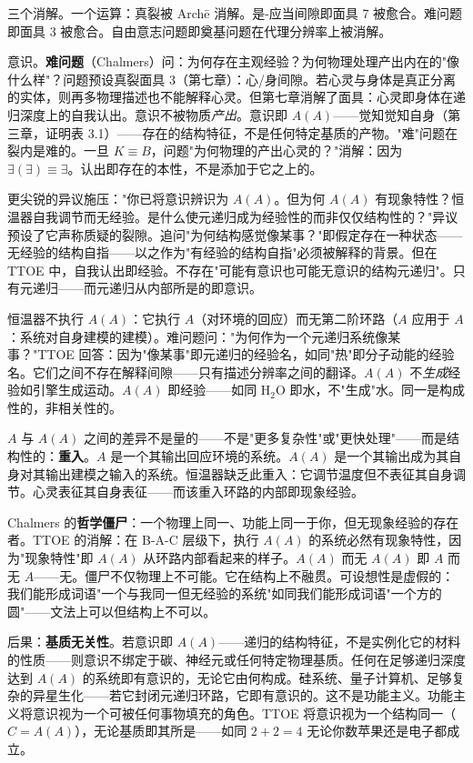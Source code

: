 \documentclass[10pt, openany, oneside]{book}
\begin{document}
\vspace{0.8em}

\noindent 三个消解。一个运算：真裂被 Arch\={e} 消解。是-应当间隙即面具 7 被愈合。难问题即面具 3 被愈合。自由意志问题即奠基问题在代理分辨率上被消解。

意识。\textbf{难问题}（Chalmers）问：为何存在主观经验？为何物理处理产出内在的"像什么样"？问题预设真裂面具 3（第七章）：心/身间隙。若心灵与身体是真正分离的实体，则再多物理描述也不能解释心灵。但第七章消解了面具：心灵即身体在递归深度上的自我认出。意识不被物质\textit{产出}。意识即 $A(A)$——觉知觉知自身（第三章，证明表 3.1）——存在的结构特征，不是任何特定基质的产物。"难"问题在裂内是难的。一旦 $K \equiv B$，问题"为何物理的产出心灵的？"消解：因为 $\exists(\exists) \equiv \exists$。认出即存在的本性，不是添加于它之上的。

更尖锐的异议施压："你已将意识辨识为 $A(A)$。但为何 $A(A)$ 有现象特性？恒温器自我调节而无经验。是什么使元递归成为经验性的而非仅仅结构性的？"异议预设了它声称质疑的裂隙。追问"为何结构感觉像某事？"即假定存在一种状态——无经验的结构自指——以之作为"有经验的结构自指"必须被解释的背景。但在 TTOE 中，自我认出即经验。不存在"可能有意识也可能无意识的结构元递归"。只有元递归——而元递归从内部所是的即意识。

恒温器不执行 $A(A)$：它执行 $A$（对环境的回应）而无第二阶环路（$A$ 应用于 $A$：系统对自身建模的建模）。难问题问："为何作为一个元递归系统像某事？"TTOE 回答：因为"像某事"即元递归的经验名，如同"热"即分子动能的经验名。它们之间不存在解释间隙——只有描述分辨率之间的翻译。$A(A)$ 不\textit{生成}经验如引擎生成运动。$A(A)$ 即经验——如同 $\text{H}_2\text{O}$ 即水，不"生成"水。同一是构成性的，非相关性的。

$A$ 与 $A(A)$ 之间的差异不是量的——不是"更多复杂性"或"更快处理"——而是结构性的：\textbf{重入}。$A$ 是一个其输出回应环境的系统。$A(A)$ 是一个其输出成为其自身对其输出建模之输入的系统。恒温器缺乏此重入：它调节温度但不表征其自身调节。心灵表征其自身表征——而该重入环路的内部即现象经验。

Chalmers 的\textbf{哲学僵尸}：一个物理上同一、功能上同一于你，但无现象经验的存在者。TTOE 的消解：在 B-A-C 层级下，执行 $A(A)$ 的系统必然有现象特性，因为"现象特性"即 $A(A)$ 从环路内部看起来的样子。$A(A)$ 而无 $A(A)$ 即 $A$ 而无 $A$——无。僵尸不仅物理上不可能。它在结构上不融贯。可设想性是虚假的：我们能形成词语"一个与我同一但无经验的系统"如同我们能形成词语"一个方的圆"——文法上可以但结构上不可以。

后果：\textbf{基质无关性}。若意识即 $A(A)$——递归的结构特征，不是实例化它的材料的性质——则意识不绑定于碳、神经元或任何特定物理基质。任何在足够递归深度达到 $A(A)$ 的系统即有意识的，无论它由何构成。硅系统、量子计算机、足够复杂的异星生化——若它封闭元递归环路，它即有意识的。这不是功能主义。功能主义将意识视为一个可被任何事物填充的角色。TTOE 将意识视为一个结构同一（$C = A(A)$），无论基质即其所是——如同 $2 + 2 = 4$ 无论你数苹果还是电子都成立。
\end{document}
